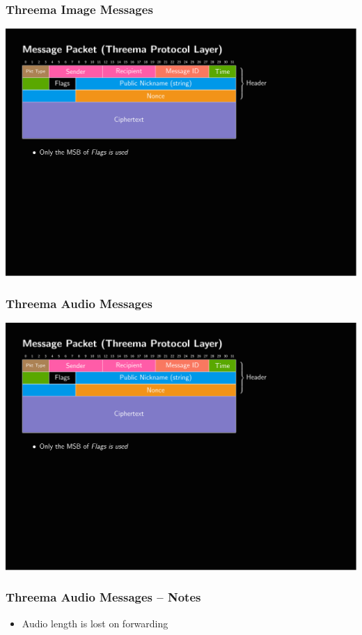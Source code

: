 \documentclass[
	aspectratio=169,
	xetex,
]{beamer}
\begin{document}
\begin{frame}
	\frametitle{Threema Image Messages}
	\includegraphics[page=4,clip,trim={.99cm 7.5cm 3.2cm 1.8cm},width=\textwidth]{out/messages.pdf}
\end{frame}

\begin{frame}
	\frametitle{Threema Audio Messages}
	\includegraphics[page=5,clip,trim={.99cm 7.5cm 3.2cm 1.8cm},width=\textwidth]{out/messages.pdf}
\end{frame}

\begin{frame}
	\frametitle{Threema Audio Messages -- Notes}
	\begin{itemize}
		\item Audio length is lost on forwarding
	\end{itemize}
\end{frame}
\end{document}
